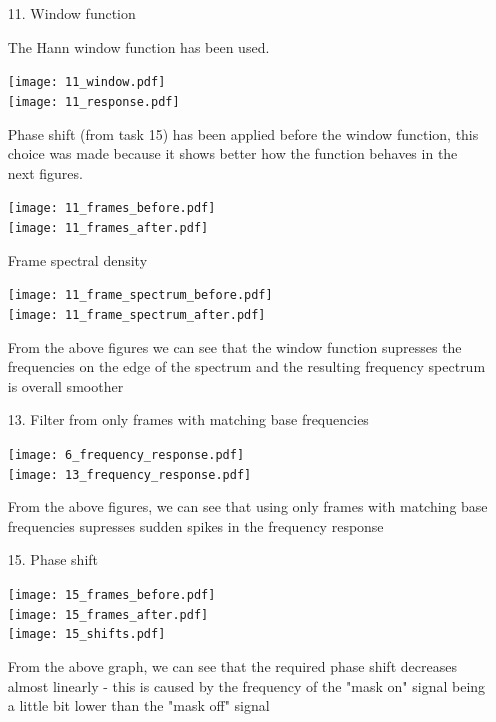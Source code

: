 \documentclass[a4paper, 11pt]{article}
\begin{document}
    \begin{enumerate}
        \item[11.]
        Window function

        The Hann window function has been used.

        \texttt{[image: 11\_window.pdf]} \\
        \texttt{[image: 11\_response.pdf]}

        Phase shift (from task 15) has been applied before the window function,
        this choice was made because it shows better how the function behaves in the next figures.

        \texttt{[image: 11\_frames\_before.pdf]} \\
        \texttt{[image: 11\_frames\_after.pdf]}

        \newpage
        Frame spectral density

        \texttt{[image: 11\_frame\_spectrum\_before.pdf]} \\
        \texttt{[image: 11\_frame\_spectrum\_after.pdf]}

        From the above figures we can see that the window function
        supresses the frequencies on the edge of the spectrum and the resulting frequency spectrum is overall smoother

        \vspace{6mm}
        \item[13.]
        Filter from only frames with matching base frequencies

        \texttt{[image: 6\_frequency\_response.pdf]} \\
        \texttt{[image: 13\_frequency\_response.pdf]}

        From the above figures, we can see that using only frames with matching base frequencies supresses
        sudden spikes in the frequency response

        \newpage
        \item[15.]
        Phase shift

        \texttt{[image: 15\_frames\_before.pdf]} \\
        \texttt{[image: 15\_frames\_after.pdf]} \\
        \texttt{[image: 15\_shifts.pdf]}

        From the above graph, we can see that the required phase shift decreases almost linearly -
        this is caused by the frequency of the "mask on" signal being a little bit lower than the "mask off" signal


\end{enumerate}
\end{document}
